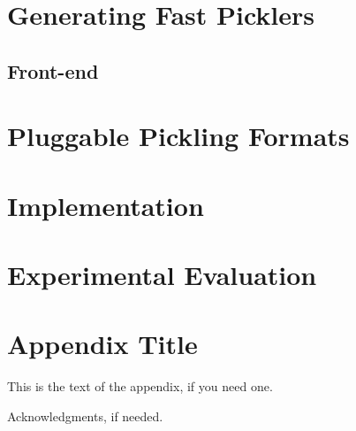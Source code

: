 \documentclass[preprint,10pt]{sigplanconf}
\begin{document}
\section{Generating Fast Picklers}

\subsection{Front-end}


\section{Pluggable Pickling Formats}

\section{Implementation}

\section{Experimental Evaluation}

\appendix
\section{Appendix Title}

This is the text of the appendix, if you need one.

\acks

Acknowledgments, if needed.









\end{document}
